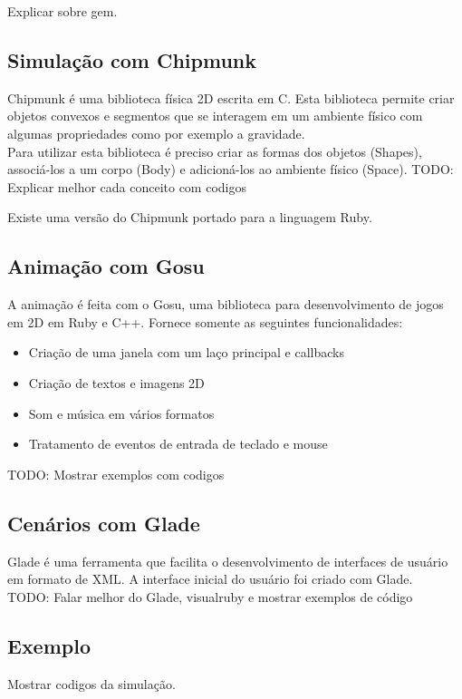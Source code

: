 Explicar sobre gem.

\subsection{Simulação com Chipmunk}
Chipmunk é uma biblioteca física 2D escrita em C. Esta biblioteca permite criar objetos convexos e segmentos que se interagem em um ambiente físico com algumas propriedades 
como por exemplo a gravidade. \\

Para utilizar esta biblioteca é preciso criar as formas dos objetos (Shapes), associá-los a um corpo (Body) e adicioná-los ao ambiente físico (Space).
TODO: Explicar melhor cada conceito com codigos

Existe uma versão do Chipmunk portado para a linguagem Ruby.

\subsection{Animação com Gosu}
A animação é feita com o Gosu, uma biblioteca para desenvolvimento de jogos em 2D em Ruby e C++. Fornece somente as seguintes funcionalidades:

\begin{itemize}
  \item Criação de uma janela com um laço principal e callbacks
  \item Criação de textos e imagens 2D
  \item Som e música em vários formatos
  \item Tratamento de eventos de entrada de teclado e mouse
\end{itemize}

TODO: Mostrar exemplos com codigos

\subsection{Cenários com Glade}
Glade é uma ferramenta que facilita o desenvolvimento de interfaces de usuário em formato de XML. A interface inicial do usuário foi criado com Glade.\\

TODO: Falar melhor do Glade, visualruby e mostrar exemplos de código
\subsection{Exemplo}

Mostrar codigos da simulação.

